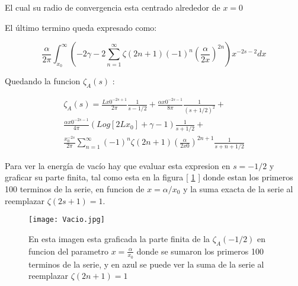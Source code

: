 El cual su radio de convergencia esta centrado alrededor de $x = 0$


El último termino queda expresado como:

\begin{equation}
\frac{\alpha}{2 \pi}
\int _{x_0} ^{\infty}
\left(
-2 \gamma -
2 \sum _{n=1} ^{\infty}
\zeta (2n+1) (-1) ^{n}
\left( \frac{\alpha}{2 x} \right) ^{2n}
\right)
x ^{-2s-2} dx
\end{equation}

Quedando la funcion $\zeta _A (s) $ :

\begin{equation}
\begin{array}{c}
\zeta _A (s) = 
\frac{L x0 ^{-2s+1} }{2 \pi } \frac{1}{s- 1/2} + 
\frac{\alpha x0 ^{-2s-1} }{8 \pi } \frac{1}{(s+1/2) ^2} + \\
\frac{\alpha x0 ^{-2s-1} }{4 \pi } 
\left(
Log[2 L x_0] + \gamma - 1
\right)
\frac{1}{s+1/2} + \\
\frac{x_0 ^{-2s}}{2\pi} 
\sum _{n=1} ^{\infty} (-1) ^{n} \zeta (2n+1) 
( \frac{\alpha}{2 x0} ) ^{2n+1} \frac{1}{s+n+1/2}
\end{array}
\end{equation}

Para ver la energía de vacío hay que evaluar esta expresion en $s=-1/2$ y graficar su parte finita, tal como esta en la figura [ \ref{fig:vacio} ] donde estan los primeros 100 terminos de la serie, en funcion de $x = \alpha / x_0$ y la suma exacta de la serie al reemplazar $\zeta (2s+1) = 1$.

\begin{figure}
    \centering
    \texttt{[image: Vacio.jpg]}
    \caption{En esta imagen esta graficada la parte finita de la $\zeta _A (-1/2) $ en funcion del parametro $x= \frac{\alpha}{x _0}$ donde se sumaron los primeros 100 terminos de la serie, y en azul se puede ver la suma de la serie al reemplazar $\zeta (2n+1) = 1$}
    \label{fig:vacio}
\end{figure}